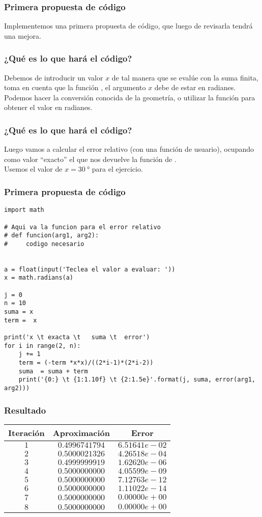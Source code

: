\documentclass[12pt]{beamer}
\begin{document}
\begin{frame}
\frametitle{Primera propuesta de código}
Implementemos una primera propuesta de código, que luego de revisarla tendrá una mejora.
\end{frame}
\begin{frame}
\frametitle{¿Qué es lo que hará el código?}
Debemos de introducir un valor $x$ de tal manera que se evalúe con la suma finita, toma en cuenta que la función , el argumento $x$ debe de estar en radianes.
\\
\bigskip
\pause
Podemos hacer la conversión conocida de la geometría, \pause o utilizar la función  para obtener el valor en radianes.
\end{frame}
\begin{frame}
\frametitle{¿Qué es lo que hará el código?}
Luego vamos a calcular el error relativo (con una función de usuario), ocupando como valor \enquote{exacto} el que nos devuelve la función  de \python.
\\
\bigskip
\pause
Usemos el valor de $x = \SI{30}{\degree}$ para el ejercicio.
\end{frame}
\begin{frame}
\frametitle{Primera propuesta de código}
\begin{lstlisting}[caption=Código para aproximar sen(x)]
import math

# Aqui va la funcion para el error relativo
# def funcion(arg1, arg2):
#     codigo necesario


a = float(input('Teclea el valor a evaluar: '))
x = math.radians(a)

j = 0
n = 10
suma = x
term =  x

print('x \t exacta \t   suma \t  error')
for i in range(2, n):
    j += 1
    term = (-term *x*x)/((2*i-1)*(2*i-2))
    suma  = suma + term
    print('{0:} \t {1:1.10f} \t {2:1.5e}'.format(j, suma, error(arg1, arg2)))
\end{lstlisting}
\end{frame}
\begin{frame}
\frametitle{Resultado}
\begin{table}
\renewcommand{\arraystretch}{0.8}
\begin{tabular}{c c c}
Iteración & Aproximación & Error \\ \hline
$1$ & $0.4996741794$ & $6.51641e-02$ \\
$2$ & $0.5000021326$ & $4.26518e-04$ \\
$3$ & $0.4999999919$ & $1.62620e-06$ \\
$4$ & $0.5000000000$ & $4.05599e-09$ \\
$5$ & $0.5000000000$ & $7.12763e-12$ \\
$6$ & $0.5000000000$ & $1.11022e-14$ \\
$7$ & $0.5000000000$ & $0.00000e+00$ \\
$8$ & $0.5000000000$ & $0.00000e+00$ \\
\end{tabular}
\end{table}
\end{frame}
\end{document}

